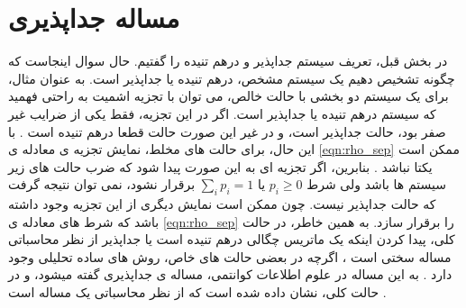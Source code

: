 \section{مساله جداپذیری}

در بخش قبل، تعریف سیستم جداپذیر و درهم تنیده را گفتیم. حال سوال اینجاست که چگونه تشخیص دهیم یک سیستم مشخص، درهم تنیده یا جداپذیر است.
به عنوان مثال، برای یک سیستم دو بخشی با حالت خالص،‌ می توان با تجزیه اشمیت
به راحتی فهمید که سیستم درهم تنیده یا جداپذیر است.
اگر در این تجزیه، فقط یکی از ضرایب غیر صفر بود، حالت جداپذیر است، و در غیر این صورت حالت قطعا درهم تنیده است
\cite{Ekert1995,Sciara2017}.
با این حال، برای حالت های مخلط، نمایش تجزیه ی معادله ی
\ref{eqn:rho_sep}
ممکن است یکتا نباشد
\cite{Ekert1995,Sciara2017}.
بنابرین، اگر تجزیه ای به این صورت پیدا شود که ضرب حالت های زیر سیستم ها باشد ولی شرط
$p_i \geq 0$
یا
$\sum_i p_i =1$
برقرار نشود، نمی توان نتیجه گرفت که حالت جداپذیر نیست. چون ممکن است نمایش دیگری از این تجزیه وجود داشته باشد که شرط های معادله ی
\ref{eqn:rho_sep}
را برقرار سازد.
به همین خاطر، در حالت کلی، پیدا کردن اینکه یک ماتریس چگالی درهم تنیده است یا جداپذیر از نظر محاسباتی مساله سختی است
\cite{Vedral1997}،
اگرچه در بعضی حالت های خاص،‌ روش های ساده تحلیلی وجود دارد
\cite{horodecki_1996}.
به این مساله در علوم اطلاعات کوانتمی، مساله ی جداپذیری گفته میشود،
و در حالت کلی، نشان داده شده است که از نظر محاسباتی یک مساله
است
\cite{gharibia_2010}.
